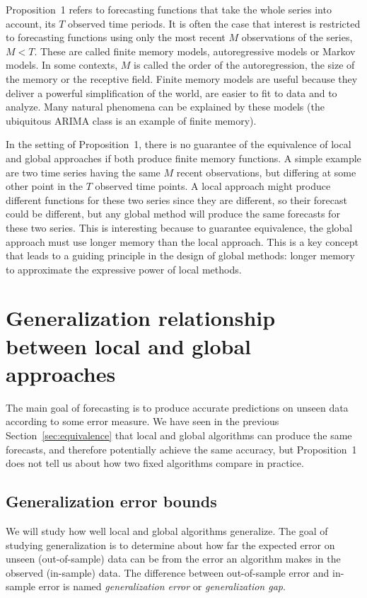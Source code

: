 \documentclass[a4paper]{article}
\theoremstyle{custom}
\begin{document}
Proposition~1 refers to forecasting functions that take the whole series into account, its $T$ observed time periods. It is often the case that interest is restricted to forecasting functions using only the most recent $M$ observations of the series, $M<T$. These are called finite memory
models, autoregressive models or Markov models. In some contexts, $M$ is called the order of the autoregression, the size of the memory or the receptive field. Finite memory models are useful because they deliver a powerful simplification of the world, are easier to fit to data and to analyze. Many natural phenomena can be explained by these models (the ubiquitous ARIMA class is an example of finite memory).

In the setting of Proposition~1, there is no guarantee of the equivalence of local and global approaches if both produce finite memory functions. A simple example are two time series having the same $M$ recent observations, but differing at some other point in the $T$ observed time points. A local approach might produce different functions for these two series since they are different, so their forecast could be different, but any global method will produce the same forecasts for these two series. This is interesting because to guarantee equivalence, the global approach must use longer memory than the local approach. This is a key concept that leads to a guiding principle in the design of global methods: longer memory to approximate the expressive power of local methods.

\section{Generalization relationship between local and global approaches}
\label{sec:genbounds}

The main goal of forecasting is to produce accurate predictions on unseen data according to some error measure.
We have seen in the previous Section~\ref{sec:equivalence} that local and global algorithms can produce the same forecasts,
and therefore potentially achieve the same accuracy, but Proposition~1 does not tell us about how two fixed algorithms compare in practice.

\subsection{Generalization error bounds}

We will study how well local and global algorithms generalize. The goal of studying generalization is to determine about how far the expected error on unseen (out-of-sample) data can be from the error an algorithm makes in the observed (in-sample) data. The difference between out-of-sample error and in-sample error is named \textit{generalization error} or \textit{generalization gap}.
\end{document}
